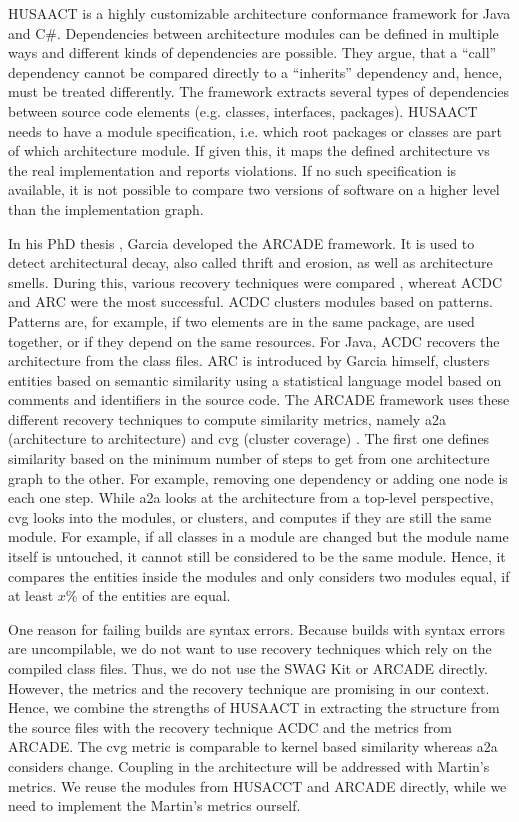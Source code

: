 \documentclass[conference]{IEEEtran}
\begin{document}
HUSAACT \cite{Husacct1,Husacct2} is a highly customizable architecture conformance framework for Java and C\#. Dependencies between architecture modules can be defined in multiple ways and different kinds of dependencies are possible. They argue, that a ``call'' dependency cannot be compared directly to a ``inherits'' dependency and, hence, must be treated differently. 
The framework extracts several types of dependencies between source code elements (e.g. classes, interfaces, packages). HUSAACT needs to have a module specification, i.e. which root packages or classes are part of which architecture module. If given this, it maps the defined architecture vs the real implementation and reports violations.
If no such specification is available, it is not possible to compare two versions of software on a higher level than the implementation graph. 

In his PhD thesis \cite{arcade-thesis}, Garcia developed the ARCADE framework. It is used to detect architectural decay, also called thrift and erosion, as well as architecture smells. During this, various recovery techniques were compared \cite{arcRec-comparison}, whereat ACDC \cite{ACDC} and ARC were the most successful. 
ACDC clusters modules based on patterns. Patterns are, for example, if two elements are in the same package, are used together, or if they depend on the same resources. For Java, ACDC recovers the architecture from the class files. ARC is introduced by Garcia himself, clusters entities based on semantic similarity using a statistical language model based on comments and identifiers in the source code.
The ARCADE framework uses these different recovery techniques to compute similarity metrics, namely a2a (architecture to architecture) and cvg (cluster coverage) \cite{Arcade}. 
The first one defines similarity based on the minimum number of steps to get from one architecture graph to the other. For example, removing one dependency or adding one node is each one step. While a2a looks at the architecture from a top-level perspective, cvg looks into the modules, or clusters, and computes if they are still the same module. For example, if all classes in a module are changed but the module name itself is untouched, it cannot still be considered to be the same module. Hence, it compares the entities inside the modules and only considers two modules equal, if at least $x \%$ of the entities are equal.

One reason for failing builds are syntax errors. Because builds with syntax errors are uncompilable, we do not want to use recovery techniques which rely on the compiled class files. Thus, we do not use the SWAG Kit or ARCADE directly.
However, the metrics and the recovery technique are promising in our context. Hence, we combine the strengths of HUSAACT in extracting the structure from the source files with the recovery technique ACDC and the metrics from ARCADE. The cvg metric is comparable to kernel based similarity whereas a2a considers change. Coupling in the architecture will be addressed with Martin's metrics. We reuse the modules from HUSACCT and ARCADE directly, while we need to implement the Martin's metrics ourself. 
\end{document}
